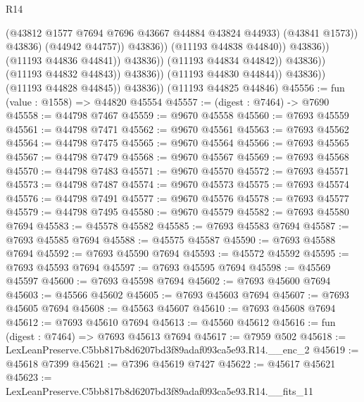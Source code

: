 \begin{lexlean}{R14}
\begin{coremodule}
                                                  (@43812
                                                    @1577
                                                    @7694
                                                    @7696
                                                    @43667
                                                    @44884
                                                    @43824
                                                    @44933)
                                                  (@43841 @1573))
                                                @43836)
                                              (@44942 @44757))
                                            @43836))
                                        (@11193 @44838 @44840))
                                      @43836))
                                  (@11193 @44836 @44841))
                                @43836))
                            (@11193 @44834 @44842))
                          @43836))
                      (@11193 @44832 @44843))
                    @43836))
                (@11193 @44830 @44844))
              @43836))
          (@11193 @44828 @44845))
        @43836))
    (@11193 @44825 @44846)
@45556 := fun (value : @1558) => @44820 @45554
@45557 := (digest : @7464) -> @7690
@45558 := @44798 @7467
@45559 := @9670 @45558
@45560 := @7693 @45559
@45561 := @44798 @7471
@45562 := @9670 @45561
@45563 := @7693 @45562
@45564 := @44798 @7475
@45565 := @9670 @45564
@45566 := @7693 @45565
@45567 := @44798 @7479
@45568 := @9670 @45567
@45569 := @7693 @45568
@45570 := @44798 @7483
@45571 := @9670 @45570
@45572 := @7693 @45571
@45573 := @44798 @7487
@45574 := @9670 @45573
@45575 := @7693 @45574
@45576 := @44798 @7491
@45577 := @9670 @45576
@45578 := @7693 @45577
@45579 := @44798 @7495
@45580 := @9670 @45579
@45582 := @7693 @45580 @7694
@45583 := @45578 @45582
@45585 := @7693 @45583 @7694
@45587 := @7693 @45585 @7694
@45588 := @45575 @45587
@45590 := @7693 @45588 @7694
@45592 := @7693 @45590 @7694
@45593 := @45572 @45592
@45595 := @7693 @45593 @7694
@45597 := @7693 @45595 @7694
@45598 := @45569 @45597
@45600 := @7693 @45598 @7694
@45602 := @7693 @45600 @7694
@45603 := @45566 @45602
@45605 := @7693 @45603 @7694
@45607 := @7693 @45605 @7694
@45608 := @45563 @45607
@45610 := @7693 @45608 @7694
@45612 := @7693 @45610 @7694
@45613 := @45560 @45612
@45616 := fun (digest : @7464) => @7693 @45613 @7694
@45617 := @7959 @502
@45618 := LexLeanPreserve.C5bb817b8d6207bd3f89adaf093ca5e93.R14.__enc_2
@45619 := @45618 @7399
@45621 := @7396 @45619 @7427
@45622 := @45617 @45621
@45623 := LexLeanPreserve.C5bb817b8d6207bd3f89adaf093ca5e93.R14.__fits_11

\end{coremodule}
\end{lexlean}
